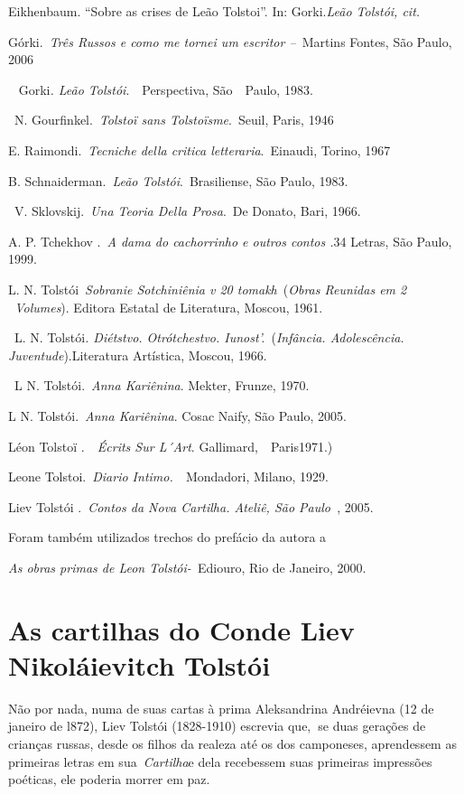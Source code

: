  Eikhenbaum. ``Sobre as crises de Leão Tolstoi''. In: 
Gorki.\emph{Leão Tolstói, cit.}

 Górki.~\emph{Três Russos e como me tornei um escritor --~}Martins
Fontes, São Paulo, 2006

~ Gorki\emph{. Leão Tolstói}.~~Perspectiva, São~~Paulo, 1983.

~N. Gourfinkel.~\emph{Tolstoï sans Tolstoïsme}.~Seuil, Paris, 1946

E. Raimondi.~\emph{Tecniche della critica letteraria}.~Einaudi, Torino,
1967

B. Schnaiderman.~\emph{Leão Tolstói}.~Brasiliense, São Paulo, 1983.

~V. Sklovskij.~\emph{Una Teoria Della Prosa}.~De Donato, Bari, 1966.

A. P. Tchekhov .~\emph{A dama do cachorrinho e outros contos .}34
Letras, São Paulo, 1999.

L. N. Tolstói~\emph{Sobranie Sotchiniênia v 20 tomakh}~(\emph{Obras
Reunidas em 2 ~Volumes}). Editora Estatal de Literatura, Moscou, 1961.

~L. N. Tolstói\emph{. Diétstvo. Otrótchestvo. Iunost'.}~(\emph{Infância.
Adolescência.~~~} \emph{Juventude}).Literatura Artística, Moscou, 1966.

~L N. Tolstói.~\emph{Anna Kariênina}. Mekter, Frunze, 1970.

L N. Tolstói.~\emph{Anna Kariênina}. Cosac Naify, São Paulo, 2005.

Léon Tolstoï .~\emph{~Écrits Sur L´Art}. Gallimard,~~Paris1971.)

Leone Tolstoi.~\emph{Diario Intimo.~}~Mondadori, Milano, 1929.

Liev Tolstói .~\emph{Contos da Nova Cartilha. Ateliê, São Paulo~},
2005.~

Foram também utilizados trechos do prefácio da autora a

\emph{As obras primas de Leon Tolstói-~}Ediouro, Rio de Janeiro, 2000.

\chapter{As cartilhas do Conde Liev Nikoláievitch Tolstói}

Não por nada, numa de suas cartas à prima Aleksandrina Andréievna (12 de
janeiro de l872), Liev Tolstói (1828-1910) escrevia que,\textbf{~}se
duas gerações de crianças russas, desde os filhos da realeza até os dos
camponeses, aprendessem as primeiras letras em sua~\emph{Cartilha}e dela
recebessem suas primeiras impressões poéticas, ele poderia morrer em
paz.

